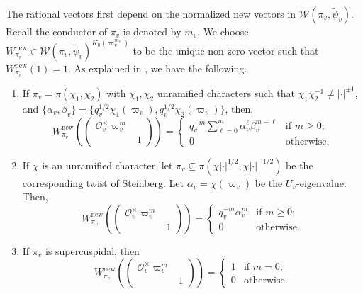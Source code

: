 \documentclass[10pt, twoside]{amsart}
\theoremstyle{plain}
\theoremstyle{definition}
\theoremstyle{remark}
\numberwithin{equation}{subsection}
\def\new{\mathrm{new}}
\def\scro{\mathscr O}
\def\calw{\mathcal W}
\def\scro{\mathscr O}
\begin{document}
The rational vectors first depend on the normalized new vectors in $\calw(\pi_v,\widetilde \psi_v)$. Recall the conductor of $\pi_v$ is denoted by $m_v$. We choose $W_{\pi_v}^{\new} \in \mathcal W(\pi_v,\widetilde \psi_v)^{K_0(\varpi_v^{m_v})}$ to be the unique non-zero vector such that $W_{\pi_v}^{\new}(1) = 1$. As explained in \cite[\S 3.3.1]{RaTa}, we have the following.
\begin{enumerate}[label=(\Roman*)]
 \item If $\pi_v = \pi(\chi_1,\chi_2)$ with $\chi_1,\chi_2$ unramified characters such that $\chi_1\chi_2^{-1} \neq |\cdot|^{\pm 1}$, and $\{\alpha_v,\beta_v\} = \{q_v^{1/2}\chi_1(\varpi_v),q_v^{1/2}\chi_2(\varpi_v)\}$, then,\label{enum-part:whit-ps}
\begin{equation*}
W_{\pi_v}^{\new}\left(\begin{pmatrix} \scro_v^\times \varpi_v^{m} & \\ & 1 \end{pmatrix}\right) = \begin{cases}
q_v^{-m} \sum_{\ell=0}^m \alpha_v^{\ell}\beta_v^{m-\ell} & \text{if $m \geq 0$;}\\
0 & \text{otherwise}.
\end{cases}
\end{equation*}
\item If $\chi$ is an unramified character, let $\pi_v \subseteq \pi(\chi |\cdot|^{1/2} , \chi |\cdot|^{-1/2})$ be the corresponding twist of Steinberg. Let $\alpha_v = \chi(\varpi_v)$ be the $U_v$-eigenvalue. Then,\label{enum-part:whit-st}
\begin{equation*}
W_{\pi_v}^{\new}\left(\begin{pmatrix} \scro_v^\times\varpi_v^{m} & \\ & 1 \end{pmatrix}\right) = \begin{cases}
q_v^{-m} \alpha_v^m & \text{if $m \geq 0$;}\\
0 & \text{otherwise}.
\end{cases}
\end{equation*}
\item If $\pi_v$ is supercuspidal, then\label{enum-part:whit-sc}
\begin{equation*}
W_{\pi_v}^{\new}\left(\begin{pmatrix} \scro_v^\times\varpi_v^{m} & \\ & 1 \end{pmatrix}\right) = \begin{cases}
1 & \text{if $m=0$;}\\
0 & \text{otherwise}.
\end{cases}
\end{equation*}
\end{enumerate}
\end{document}
